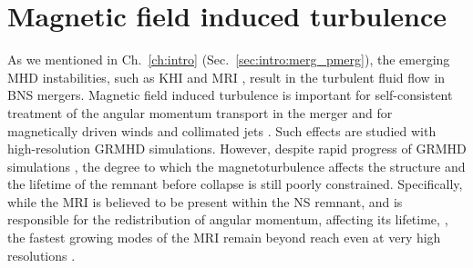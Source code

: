 


\section{Magnetic field induced turbulence}\label{sec:nr_methds:visc}

As we mentioned in Ch.~\ref{ch:intro} (Sec.~\ref{sec:intro:merg_pmerg}),
the emerging \ac{MHD} instabilities, such as \ac{KHI} 
and \ac{MRI} \citep{Balbus:1991}, result in the turbulent 
fluid flow in \ac{BNS} mergers.
%
Magnetic field induced turbulence is important for 
self-consistent treatment of the angular momentum transport in the merger
\citep{Duez:2006qe,Kiuchi:2014hja,Guilet:2016sqd,Kiuchi:2017zzg}
and for magnetically driven winds and collimated jets 
\citep{Rezzolla:2011da,Bucciantini:2011kx,Siegel:2014ita,Ruiz:2016rai,Metzger:2018uni}.
%
Such effects are studied with high-resolution \ac{GRMHD} simulations. 
However, despite rapid progress of \ac{GRMHD} simulations 
\citep[\eg][]{Rezzolla:2011da,Kiuchi:2014hja,Ruiz:2016rai},
the degree to which the magnetoturbulence affects the structure and the 
lifetime of the remnant before collapse is still poorly constrained.
%
Specifically, while the \ac{MRI} is believed to be present within the 
\pmerg{} \ac{NS} remnant, and is responsible for the redistribution of angular 
momentum, affecting 
its lifetime, \citep[\eg][]{Duez:2006qe,Siegel:2013nrw}, 
the fastest growing modes of the \ac{MRI} remain beyond 
reach even at very high resolutions \citep[\eg][]{Kiuchi:2014hja}.
%
